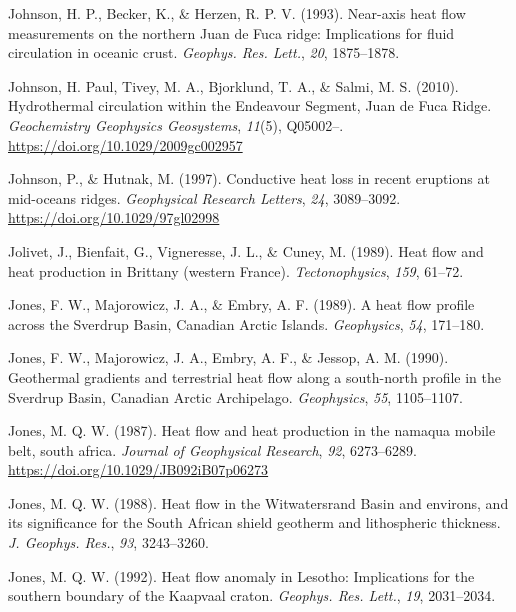 \documentclass[draft,linenumbers]{agujournal2018}
\begin{document}
\leavevmode{}%
Johnson, H. P., Becker, K., \& Herzen, R. P. V. (1993). Near-axis heat
flow measurements on the northern {Juan de Fuca} ridge: Implications for
fluid circulation in oceanic crust. \emph{Geophys. Res. Lett.},
\emph{20}, 1875--1878.

\leavevmode{}%
Johnson, H. Paul, Tivey, M. A., Bjorklund, T. A., \& Salmi, M. S.
(2010). Hydrothermal circulation within the {Endeavour Segment, Juan de
Fuca Ridge}. \emph{Geochemistry Geophysics Geosystems}, \emph{11}(5),
Q05002--. \url{https://doi.org/10.1029/2009gc002957}

\leavevmode{}%
Johnson, P., \& Hutnak, M. (1997). Conductive heat loss in recent
eruptions at mid-oceans ridges. \emph{Geophysical Research Letters},
\emph{24}, 3089--3092. \url{https://doi.org/10.1029/97gl02998}

\leavevmode{}%
Jolivet, J., Bienfait, G., Vigneresse, J. L., \& Cuney, M. (1989). Heat
flow and heat production in {Brittany (western France)}.
\emph{Tectonophysics}, \emph{159}, 61--72.

\leavevmode{}%
Jones, F. W., Majorowicz, J. A., \& Embry, A. F. (1989). A heat flow
profile across the {Sverdrup Basin}, {Canadian Arctic Islands}.
\emph{Geophysics}, \emph{54}, 171--180.

\leavevmode{}%
Jones, F. W., Majorowicz, J. A., Embry, A. F., \& Jessop, A. M. (1990).
Geothermal gradients and terrestrial heat flow along a south-north
profile in the {Sverdrup Basin, Canadian Arctic Archipelago}.
\emph{Geophysics}, \emph{55}, 1105--1107.

\leavevmode{}%
Jones, M. Q. W. (1987). Heat flow and heat production in the namaqua
mobile belt, south africa. \emph{Journal of Geophysical Research},
\emph{92}, 6273--6289. \url{https://doi.org/10.1029/JB092iB07p06273}

\leavevmode{}%
Jones, M. Q. W. (1988). Heat flow in the {Witwatersrand Basin} and
environs, and its significance for the {South African} shield geotherm
and lithospheric thickness. \emph{J. Geophys. Res.}, \emph{93},
3243--3260.

\leavevmode{}%
Jones, M. Q. W. (1992). Heat flow anomaly in {Lesotho}: Implications for
the southern boundary of the {Kaapvaal} craton. \emph{Geophys. Res.
Lett.}, \emph{19}, 2031--2034.
\end{document}
